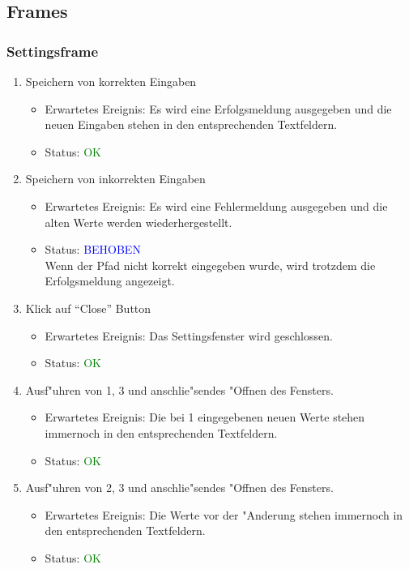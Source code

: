 \subsection{Frames}
\subsubsection{Settingsframe}
\begin{enumerate}
\item Speichern von korrekten Eingaben
\begin{itemize}
\item Erwartetes Ereignis: Es wird eine Erfolgsmeldung ausgegeben und die neuen Eingaben stehen in den entsprechenden Textfeldern.
\item Status: \textcolor{green}{OK}
\end{itemize}
\item Speichern von inkorrekten Eingaben
\begin{itemize}
\item Erwartetes Ereignis: Es wird eine Fehlermeldung ausgegeben und die alten Werte werden wiederhergestellt.  
\item Status: \textcolor{blue}{BEHOBEN} \\
Wenn der Pfad nicht korrekt eingegeben wurde, wird trotzdem die Erfolgsmeldung angezeigt.
\end{itemize}
\item Klick auf "`Close"' Button
\begin{itemize}
\item Erwartetes Ereignis: Das Settingsfenster wird geschlossen.
\item Status: \textcolor{green}{OK}
\end{itemize}
\item Ausf"uhren von 1, 3 und anschlie"sendes "Offnen des Fensters.
\begin{itemize}
\item Erwartetes Ereignis: Die bei 1 eingegebenen neuen Werte stehen immernoch in den entsprechenden Textfeldern.
\item Status: \textcolor{green}{OK}
\end{itemize}
\item Ausf"uhren von 2, 3 und anschlie"sendes "Offnen des Fensters.
\begin{itemize}
\item Erwartetes Ereignis: Die Werte vor der "Anderung stehen immernoch in den entsprechenden Textfeldern.
\item Status: \textcolor{green}{OK}
\end{itemize}
\end{enumerate}
